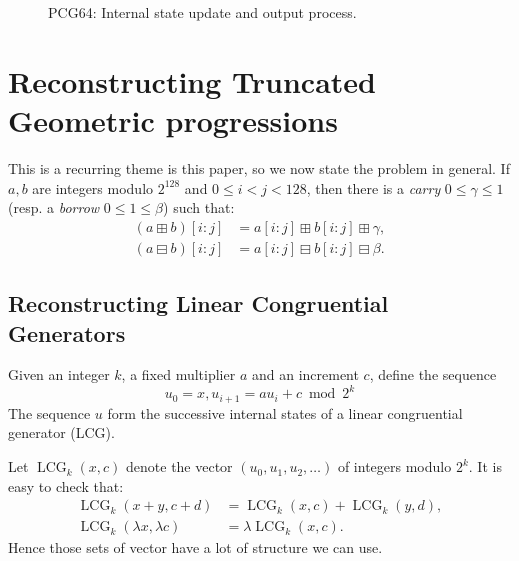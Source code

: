 \documentclass[submission,svgnames,journal=tosc]{iacrtrans}
\DeclareMathOperator{\LCG}{LCG}
\begin{document}
\begin{figure}
\begin{center}
\end{center}
\caption{\textsf{PCG64}: Internal state update and output process.}
\label{pcg128out}
\end{figure}


\section{Reconstructing Truncated Geometric progressions}
\label{sec:geometric}


This is a recurring theme is this paper, so we now state the problem in
general. If $a, b$ are integers modulo $2^{128}$ and $0\leq i<j<128$, then there
is a \emph{carry} $0 \leq \gamma \leq 1$ (resp. a \emph{borrow}
$0 \leq 1 \leq \beta$) such that:
\begin{align}
  (a \boxplus b)[i:j]  &= a[i:j] \boxplus  b[i:j] \boxplus  \gamma, \label{eq:caryy}  \\
  (a \boxminus b)[i:j] &= a[i:j] \boxminus b[i:j] \boxminus \beta.  \label{eq:borrow}
\end{align}

\subsection{Reconstructing Linear Congruential Generators}

Given an integer \(k\), a fixed multiplier \(a\) and an increment \(c\), define the
sequence \[u_0 = x, u_{i+1} = a u_i + c \bmod 2^k\] The sequence \(u\) form the
successive internal states of a linear congruential generator (LCG). 

Let $\LCG_{k}(x, c)$ denote the vector $(u_0, u_1, u_2, \dots)$ of integers
modulo $2^k$.  It is easy to check that:
\begin{align}
\label{eq:lcg-additive}
\LCG_{k}(x + y, c + d) &= \LCG_{k}(x, c) + \LCG_{k}(y, d),  \\
\label{eq:lcg-scalar}
\LCG_{k}(\lambda x, \lambda c) &= \lambda \LCG_{k}(x, c).   
\end{align}
Hence those sets of vector have a lot of structure we can use.
\end{document}
